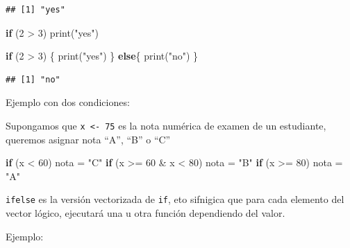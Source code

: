 \documentclass[
]{book}
\newenvironment{Shaded}{\begin{snugshade}}{\end{snugshade}}
\newcommand{\ControlFlowTok}[1]{\textcolor[rgb]{0.13,0.29,0.53}{\textbf{#1}}}
\newcommand{\DecValTok}[1]{\textcolor[rgb]{0.00,0.00,0.81}{#1}}
\newcommand{\FunctionTok}[1]{\textcolor[rgb]{0.00,0.00,0.00}{#1}}
\newcommand{\NormalTok}[1]{#1}
\newcommand{\OtherTok}[1]{\textcolor[rgb]{0.56,0.35,0.01}{#1}}
\newcommand{\SpecialCharTok}[1]{\textcolor[rgb]{0.00,0.00,0.00}{#1}}
\newcommand{\StringTok}[1]{\textcolor[rgb]{0.31,0.60,0.02}{#1}}
\begin{document}
\begin{verbatim}
## [1] "yes"
\end{verbatim}

\begin{Shaded}
\begin{Highlighting}[]
\ControlFlowTok{if}\NormalTok{ (}\DecValTok{2} \SpecialCharTok{\textgreater{}} \DecValTok{3}\NormalTok{)}
  \FunctionTok{print}\NormalTok{(}\StringTok{"yes"}\NormalTok{)}

\ControlFlowTok{if}\NormalTok{ (}\DecValTok{2} \SpecialCharTok{\textgreater{}} \DecValTok{3}\NormalTok{) \{}
  \FunctionTok{print}\NormalTok{(}\StringTok{"yes"}\NormalTok{)}
\NormalTok{\} }\ControlFlowTok{else}\NormalTok{\{}
  \FunctionTok{print}\NormalTok{(}\StringTok{"no"}\NormalTok{)}
\NormalTok{\}}
\end{Highlighting}
\end{Shaded}

\begin{verbatim}
## [1] "no"
\end{verbatim}

Ejemplo con dos condiciones:

Supongamos que \texttt{x\ \textless{}-\ 75} es la nota numérica de examen de un estudiante, queremos
asignar nota ``A'', ``B'' o ``C''

\begin{Shaded}
\begin{Highlighting}[]
\ControlFlowTok{if}\NormalTok{ (x }\SpecialCharTok{\textless{}} \DecValTok{60}\NormalTok{)}
\NormalTok{  nota }\OtherTok{=} \StringTok{"C"}
\ControlFlowTok{if}\NormalTok{ (x }\SpecialCharTok{\textgreater{}=} \DecValTok{60} \SpecialCharTok{\&}\NormalTok{ x }\SpecialCharTok{\textless{}} \DecValTok{80}\NormalTok{)}
\NormalTok{  nota }\OtherTok{=} \StringTok{"B"}
\ControlFlowTok{if}\NormalTok{ (x }\SpecialCharTok{\textgreater{}=}  \DecValTok{80}\NormalTok{)}
\NormalTok{  nota }\OtherTok{=} \StringTok{"A"}
\end{Highlighting}
\end{Shaded}

\texttt{ifelse} es la versión vectorizada de \texttt{if}, eto sifnigica que para cada elemento
del vector lógico, ejecutará una u otra función dependiendo del valor.

Ejemplo:
\end{document}
